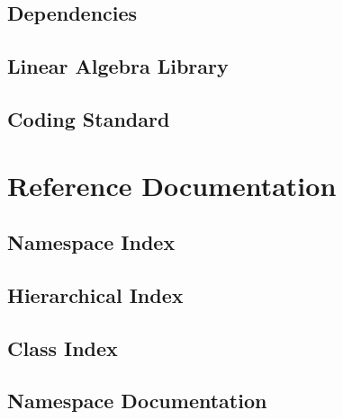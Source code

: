 \documentclass{book}
\begin{document}
\chapter{Dependencies}
\label{dependencies}
\hypertarget{dependencies}{}

\chapter{Linear Algebra Library}
\label{linear_algebra}
\hypertarget{linear_algebra}{}

\chapter{Coding Standard}

\part{Reference Documentation}
\chapter{Namespace Index}

\chapter{Hierarchical Index}

\chapter{Class Index}

\chapter{Namespace Documentation}

\end{document}
